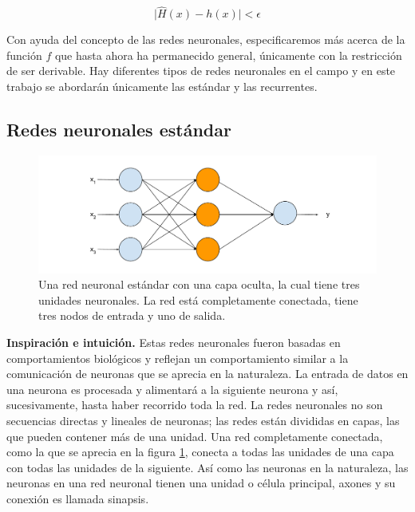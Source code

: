 \begin{equation}
\label{eq:universaltheorem}
\vert \hat{H}(x) - h(x) \vert < \epsilon
\end{equation}

Con ayuda del concepto de las redes neuronales, especificaremos más acerca de la función $f$ que hasta ahora ha permanecido general, únicamente con la restricción de ser derivable. Hay diferentes tipos de redes neuronales en el campo y en este trabajo se abordarán únicamente las estándar y las recurrentes.

\subsection{Redes neuronales estándar}

\begin{figure}
	\includegraphics[scale=.6]{Figures/standardnn.pdf}
	\caption{Una red neuronal estándar con una capa oculta, la cual tiene tres unidades neuronales. La red está completamente conectada, tiene tres nodos de entrada y uno de salida.}
	\label{fig:standardnn}
\end{figure}

\textbf{Inspiración e intuición.} Estas redes neuronales fueron basadas en comportamientos biológicos y reflejan un comportamiento similar a la comunicación de neuronas que se aprecia en la naturaleza. La entrada de datos en una neurona es procesada y alimentará a la siguiente neurona y así, sucesivamente, hasta haber recorrido toda la red. La redes neuronales no son secuencias directas y lineales de neuronas; las redes están divididas en capas, las que pueden contener más de una unidad. Una red completamente conectada, como la que se aprecia en la figura \ref{fig:standardnn}, conecta a todas las unidades de una capa con todas las unidades de la siguiente. Así como las neuronas en la naturaleza, las neuronas en una red neuronal tienen una unidad o célula principal, axones y su conexión es llamada sinapsis.

